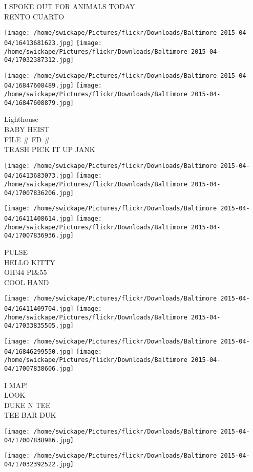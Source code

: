 \documentclass[10pt,letterpaper]{article}
\begin{document}
I SPOKE OUT FOR ANIMALS TODAY\\
RENTO CUARTO
\pagebreak

\texttt{[image: /home/swickape/Pictures/flickr/Downloads/Baltimore 2015-04-04/16413681623.jpg]}
\texttt{[image: /home/swickape/Pictures/flickr/Downloads/Baltimore 2015-04-04/17032387312.jpg]}

\texttt{[image: /home/swickape/Pictures/flickr/Downloads/Baltimore 2015-04-04/16847608489.jpg]}
\texttt{[image: /home/swickape/Pictures/flickr/Downloads/Baltimore 2015-04-04/16847608879.jpg]}

Lighthouse\\
BABY HEIST\\
FILE \# FD \#\\
TRASH PICK IT UP JANK
\pagebreak

\texttt{[image: /home/swickape/Pictures/flickr/Downloads/Baltimore 2015-04-04/16413683073.jpg]}
\texttt{[image: /home/swickape/Pictures/flickr/Downloads/Baltimore 2015-04-04/17007836206.jpg]}

\texttt{[image: /home/swickape/Pictures/flickr/Downloads/Baltimore 2015-04-04/16411408614.jpg]}
\texttt{[image: /home/swickape/Pictures/flickr/Downloads/Baltimore 2015-04-04/17007836936.jpg]}

PULSE\\
HELLO KITTY\\
OH!44 PI\&55\\
COOL HAND
\pagebreak

\texttt{[image: /home/swickape/Pictures/flickr/Downloads/Baltimore 2015-04-04/16411409704.jpg]}
\texttt{[image: /home/swickape/Pictures/flickr/Downloads/Baltimore 2015-04-04/17033835505.jpg]}

\texttt{[image: /home/swickape/Pictures/flickr/Downloads/Baltimore 2015-04-04/16846299550.jpg]}
\texttt{[image: /home/swickape/Pictures/flickr/Downloads/Baltimore 2015-04-04/17007838606.jpg]}

I MAP!\\
LOOK\\
DUKE N TEE\\
TEE BAR DUK
\pagebreak

\texttt{[image: /home/swickape/Pictures/flickr/Downloads/Baltimore 2015-04-04/17007838986.jpg]}

\vspace{0.25in}
\texttt{[image: /home/swickape/Pictures/flickr/Downloads/Baltimore 2015-04-04/17032392522.jpg]}
\end{document}
